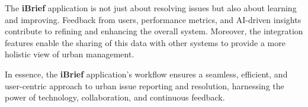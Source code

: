 The \textbf{iBrief} application is not just about resolving issues but also about learning and improving. Feedback from users, performance metrics, and AI-driven insights contribute to refining and enhancing the overall system. Moreover, the integration features enable the sharing of this data with other systems to provide a more holistic view of urban management.

In essence, the \textbf{iBrief} application's workflow ensures a seamless, efficient, and user-centric approach to urban issue reporting and resolution, harnessing the power of technology, collaboration, and continuous feedback.

